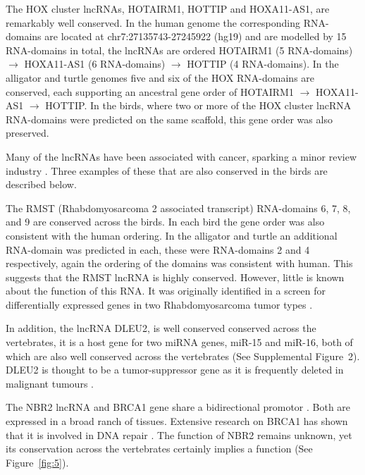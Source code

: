\documentclass[10pt]{bmc_article}
\newenvironment{bmcformat}{\begin{raggedright}\baselineskip20pt\sloppy\setboolean{publ}{false}}{\end{raggedright}\baselineskip20pt\sloppy}
\begin{document}
\begin{bmcformat}
The HOX cluster lncRNAs, HOTAIRM1, HOTTIP and HOXA11-AS1, are
remarkably well conserved. In the human genome the corresponding
RNA-domains are located at chr7:27135743-27245922 (hg19) and are
modelled by 15 RNA-domains in total, the 
lncRNAs are ordered HOTAIRM1 (5 RNA-domains) $\rightarrow$ HOXA11-AS1
(6 RNA-domains) $\rightarrow$ HOTTIP (4 RNA-domains). In the alligator
and turtle genomes five and six of the HOX RNA-domains are conserved,
each supporting an ancestral gene order of HOTAIRM1 $\rightarrow$
HOXA11-AS1 $\rightarrow$ HOTTIP. In the birds, where two or more of
the HOX cluster lncRNA RNA-domains were predicted on the same
scaffold, this gene order was also preserved.

Many of the lncRNAs have been associated with cancer, sparking a minor
review industry \cite{Prensner:2011,Spizzo:2012}. Three examples of
these that are also conserved in the birds are described below.

The RMST (Rhabdomyosarcoma 2 associated transcript) RNA-domains 6, 7,
8, and 9 are conserved across the birds. In each bird the gene order
was also consistent with the human ordering. In the alligator and
turtle an additional RNA-domain was predicted in each, these were
RNA-domains 2 and 4 respectively, again the ordering of the domains
was consistent with human. This suggests that the RMST lncRNA is
highly conserved. However, little is known about the function of this
RNA. It was originally identified in a screen for differentially
expressed genes in two Rhabdomyosarcoma tumor types \cite{Chan:2002}.

In addition, the lncRNA DLEU2, is well conserved conserved across the
vertebrates, it is a host gene for two miRNA genes, miR-15 and miR-16,
both of which are also well conserved across the vertebrates (See
Supplemental Figure~2). DLEU2 is thought to be a tumor-suppressor gene
as it is frequently deleted in malignant tumours
\cite{Lerner:2009,Klein:2010}.

The NBR2 lncRNA and BRCA1 gene share a bidirectional promotor
\cite{Xu:1997}. Both are expressed in a broad ranch of
tissues. Extensive research on BRCA1 has shown that it is involved in
DNA repair \cite{Moynahan:1999}. The function of NBR2 remains unknown,
yet its conservation across the vertebrates certainly implies a
function (See Figure~\ref{fig:5}).


\end{bmcformat}
\end{document}
